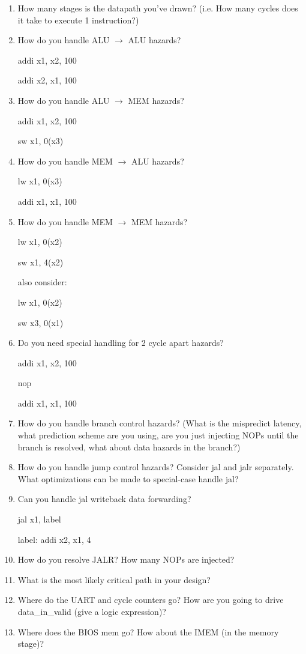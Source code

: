 \documentclass[11pt]{article}
\begin{document}
\begin{enumerate}
\item How many stages is the datapath you've drawn? (i.e. How many cycles does it take to execute 1 instruction?)
\item How do you handle ALU $\rightarrow$ ALU hazards?

addi x1, x2, 100

addi x2, x1, 100

\item How do you handle ALU $\rightarrow$ MEM hazards?

addi x1, x2, 100

sw x1, 0(x3)

\item How do you handle MEM $\rightarrow$ ALU hazards?

lw x1, 0(x3)

addi x1, x1, 100

\item How do you handle MEM $\rightarrow$ MEM hazards?

lw x1, 0(x2)

sw x1, 4(x2)

also consider:

lw x1, 0(x2)

sw x3, 0(x1)

\item Do you need special handling for 2 cycle apart hazards?

addi x1, x2, 100

 nop

 addi x1, x1, 100

\item How do you handle branch control hazards? (What is the mispredict latency, what prediction scheme are you using, are you just injecting NOPs until the branch is resolved, what about data hazards in the branch?)
\item How do you handle jump control hazards? Consider jal and jalr separately. What optimizations can be made to special-case handle jal? 
\item Can you handle jal writeback data forwarding?

jal x1, label

label: addi x2, x1, 4

\item How do you resolve JALR? How many NOPs are injected?
\item What is the most likely critical path in your design?
\item Where do the UART and cycle counters go? How are you going to drive data\_in\_valid (give a logic expression)?
\item Where does the BIOS mem go? How about the IMEM (in the memory stage)?
\end{enumerate}
\end{document}
